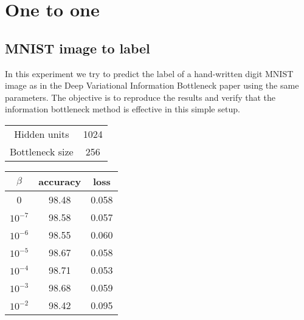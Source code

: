 \documentclass[11pt,oneside,openright]{report}
\begin{document}
\section{One to one}
\subsection{MNIST image to label}

In this experiment we try to predict the label of a hand-written digit MNIST \cite{mnist} image as in the Deep Variational Information Bottleneck paper \cite{vib} using the same parameters. The objective is to reproduce the results and verify that the information bottleneck method is effective in this simple setup.

\begin{minipage}{0.5\textwidth}
        \centering
\begin{tabular}{ c | c  }
 Hidden units & 1024 \\
 Bottleneck size & 256 \\
\end{tabular}
    \end{minipage}\hfill
    \begin{minipage}{0.5\textwidth}
        \centering
\begin{tabular}{ c | c c }
 $\beta$ & accuracy & loss \\
 \hline
0 & 98.48 & 0.058 \\
$10^{-7}$ & 98.58 & 0.057\\
$10^{-6}$ & 98.55 & 0.060\\
$10^{-5}$ & 98.67 & 0.058\\
$10^{-4}$ & 98.71 & 0.053 \\
$10^{-3}$ & 98.68 & 0.059 \\
$10^{-2}$ & 98.42 & 0.095 \\
\end{tabular}
    \end{minipage}

\begin{center}
\end{center}
\end{document}
